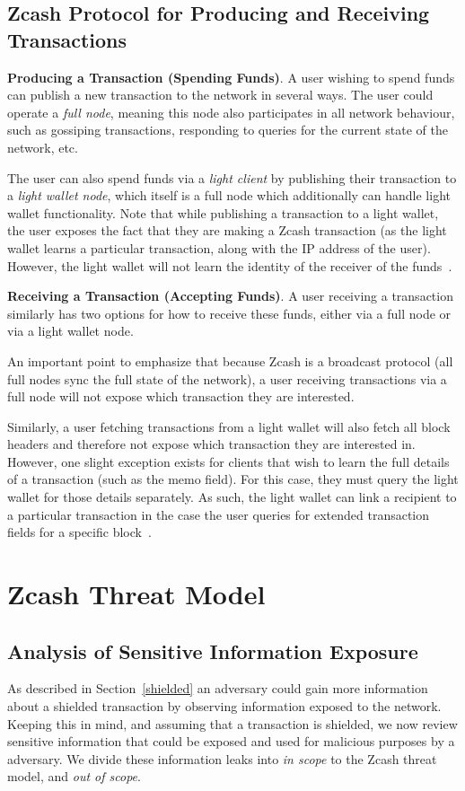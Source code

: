 \documentclass{article}
\begin{document}
\subsection{Zcash Protocol for Producing and Receiving Transactions}

\textbf{Producing a Transaction (Spending Funds)}.
A user wishing to spend
funds can publish a new transaction to the network in several ways. The user
could operate a \emph{full node}, meaning this node also participates in all
network behaviour, such as gossiping transactions, responding to queries for
the current state of the network, etc.

The user can also spend funds via a \emph{light
client} by publishing their transaction to a
\emph{light wallet node}, which itself is a full node which additionally can handle
light wallet functionality. Note that while publishing a transaction to a light
wallet, the user exposes the fact that they are making a Zcash transaction (as
the light wallet learns a particular transaction, along with the IP address of
the user). However, the light wallet will not learn the identity of the
receiver of the funds~\cite{light-wallet-spec}.

\textbf{Receiving a Transaction (Accepting Funds)}. A user receiving a
transaction similarly has two options for how to receive these funds, either
via a full node or via a light wallet node.

An important point to emphasize that because Zcash is a broadcast protocol (all
full nodes sync the full state of the network), a user receiving transactions
via a full node will not expose which transaction they are interested.

Similarly, a user fetching transactions from a light wallet will also fetch all
block headers and therefore not expose which transaction they are interested
in. However, one slight exception exists for clients that wish
to learn the full details of a transaction (such as the memo field). For this
case,
they must query the light wallet for those details separately. As such, the
light wallet can link a recipient to a particular transaction in the case the
user queries for extended transaction fields for a specific block~\cite{light-wallet-spec}.

\section{Zcash Threat Model}
\label{threat-model}

\subsection{Analysis of Sensitive Information Exposure}
As described in Section~\ref{shielded} an adversary could gain more information
about a shielded transaction by observing information exposed to the network.
Keeping this in mind, and assuming that a transaction is shielded, we now
review sensitive information that could be exposed and used for malicious
purposes by a adversary.
We divide these information leaks into \emph{in scope} to the Zcash threat
model, and \emph{out of scope}.
\end{document}
